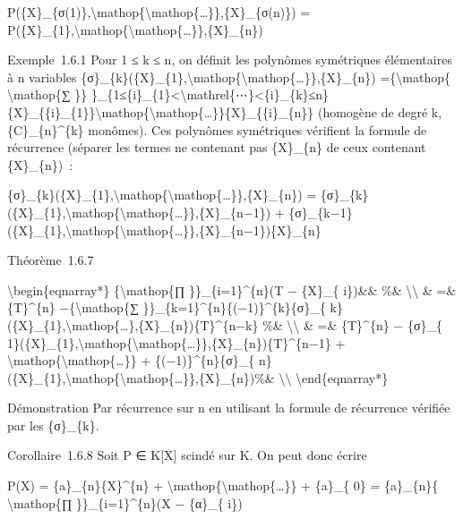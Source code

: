 \documentclass[]{article}
\begin{document}
P(\{X\}\_\{σ(1)\},\textbackslash{}mathop\{\textbackslash{}mathop\{\ldots{}\}\},\{X\}\_\{σ(n)\})
=
P(\{X\}\_\{1\},\textbackslash{}mathop\{\textbackslash{}mathop\{\ldots{}\}\},\{X\}\_\{n\})

Exemple~1.6.1 Pour 1 ≤ k ≤ n, on définit les polynômes symétriques
élémentaires à n variables
\{σ\}\_\{k\}(\{X\}\_\{1\},\textbackslash{}mathop\{\textbackslash{}mathop\{\ldots{}\}\},\{X\}\_\{n\})
=\{\textbackslash{}mathop\{ \textbackslash{}mathop\{∑ \}\}
\}\_\{1≤\{i\}\_\{1\}\textless{}\textbackslash{}mathrel\{⋯\}\textless{}\{i\}\_\{k\}≤n\}\{X\}\_\{\{i\}\_\{1\}\}\textbackslash{}mathop\{\textbackslash{}mathop\{\ldots{}\}\}\{X\}\_\{\{i\}\_\{n\}\}
(homogène de degré k, \{C\}\_\{n\}\^{}\{k\} monômes). Ces polynômes
symétriques vérifient la formule de récurrence (séparer les termes ne
contenant pas \{X\}\_\{n\} de ceux contenant \{X\}\_\{n\})~:

\{σ\}\_\{k\}(\{X\}\_\{1\},\textbackslash{}mathop\{\textbackslash{}mathop\{\ldots{}\}\},\{X\}\_\{n\})
=
\{σ\}\_\{k\}(\{X\}\_\{1\},\textbackslash{}mathop\{\textbackslash{}mathop\{\ldots{}\}\},\{X\}\_\{n−1\})
+
\{σ\}\_\{k−1\}(\{X\}\_\{1\},\textbackslash{}mathop\{\textbackslash{}mathop\{\ldots{}\}\},\{X\}\_\{n−1\})\{X\}\_\{n\}

Théorème~1.6.7

\textbackslash{}begin\{eqnarray*\} \{\textbackslash{}mathop\{∏
\}\}\_\{i=1\}\^{}\{n\}(T − \{X\}\_\{ i\})\&\& \%\&
\textbackslash{}\textbackslash{} \& =\& \{T\}\^{}\{n\}
−\{\textbackslash{}mathop\{∑
\}\}\_\{k=1\}\^{}\{n\}\{(−1)\}\^{}\{k\}\{σ\}\_\{
k\}(\{X\}\_\{1\},\textbackslash{}mathop\{\ldots{}\},\{X\}\_\{n\})\{T\}\^{}\{n−k\}
\%\& \textbackslash{}\textbackslash{} \& =\& \{T\}\^{}\{n\} − \{σ\}\_\{
1\}(\{X\}\_\{1\},\textbackslash{}mathop\{\textbackslash{}mathop\{\ldots{}\}\},\{X\}\_\{n\})\{T\}\^{}\{n−1\}
+ \textbackslash{}mathop\{\textbackslash{}mathop\{\ldots{}\}\} +
\{(−1)\}\^{}\{n\}\{σ\}\_\{
n\}(\{X\}\_\{1\},\textbackslash{}mathop\{\textbackslash{}mathop\{\ldots{}\}\},\{X\}\_\{n\})\%\&
\textbackslash{}\textbackslash{} \textbackslash{}end\{eqnarray*\}

Démonstration Par récurrence sur n en utilisant la formule de récurrence
vérifiée par les \{σ\}\_\{k\}.

Corollaire~1.6.8 Soit P ∈ K{[}X{]} scindé sur K. On peut donc écrire

P(X) = \{a\}\_\{n\}\{X\}\^{}\{n\} +
\textbackslash{}mathop\{\textbackslash{}mathop\{\ldots{}\}\} + \{a\}\_\{
0\} = \{a\}\_\{n\}\{ \textbackslash{}mathop\{∏ \}\}\_\{i=1\}\^{}\{n\}(X
− \{α\}\_\{ i\})
\end{document}
